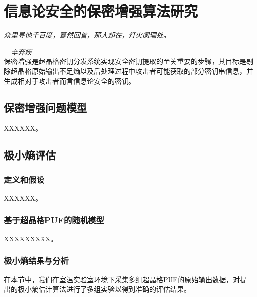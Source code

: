 \chapter{信息论安全的保密增强算法研究}
\label{ch5}

\emph{\kaishu 众里寻他千百度，蓦然回首，那人却在，灯火阑珊处。}

\emph{\kaishu \hfill ---辛弃疾}\\

保密增强是超晶格密钥分发系统实现安全密钥提取的至关重要的步骤，其目标是剔除超晶格原始输出不足熵以及后处理过程中攻击者可能获取的部分密钥串信息，并生成相对于攻击者而言信息论安全的密钥。

\section{保密增强问题模型}

XXXXXX。


\section{极小熵评估}
\subsection{定义和假设}


XXXXXX。


\subsection{基于超晶格PUF的随机模型}

XXXXXXXXX。


\subsection{极小熵结果与分析}

在本节中，我们在室温实验室环境下采集多组超晶格PUF的原始输出数据，对提出的极小熵估计算法进行了多组实验以得到准确的评估结果。



